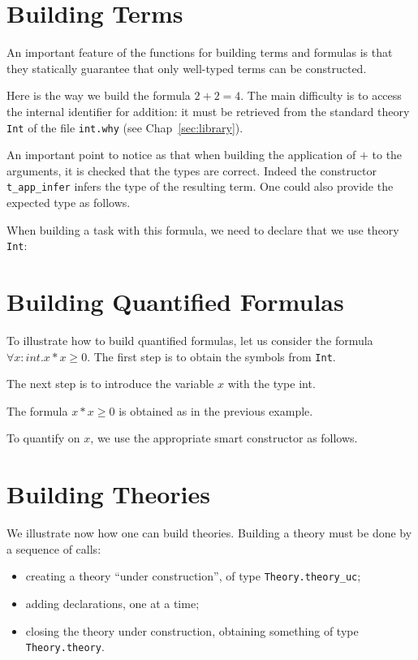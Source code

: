 \section{Building Terms}

An important feature of the functions for building terms and formulas
is that they statically guarantee that only well-typed terms can be
constructed.

Here is the way we build the formula $2+2=4$. The main difficulty is to
access the internal identifier for addition: it must be retrieved from
the standard theory \texttt{Int} of the file \texttt{int.why} (see
Chap~\ref{sec:library}).

An important point to notice as that when building the application of
$+$ to the arguments, it is checked that the types are correct. Indeed
the constructor \texttt{t\_app\_infer} infers the type of the resulting
term. One could also provide the expected type as follows.


When building a task with this formula, we need to declare that we use
theory \texttt{Int}:


\section{Building Quantified Formulas}

To illustrate how to build quantified formulas, let us consider
the formula $\forall x:int. x*x \geq 0$. The first step is to
obtain the symbols from \texttt{Int}.

The next step is to introduce the variable $x$ with the type int.

The formula $x*x \geq 0$ is obtained as in the previous example.

To quantify on $x$, we use the appropriate smart constructor as follows.


\section{Building Theories}

We illustrate now how one can build theories. Building a theory must
be done by a sequence of calls:
\begin{itemize}
\item creating a theory ``under construction'', of type \verb|Theory.theory_uc|;
\item adding declarations, one at a time;
\item closing the theory under construction, obtaining something of type \verb|Theory.theory|.
\end{itemize}

